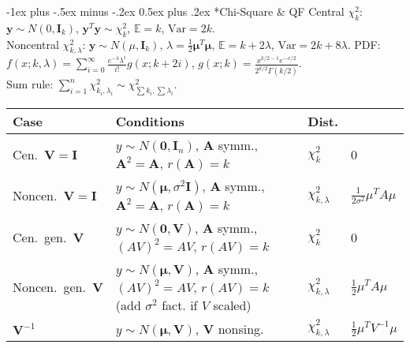 \documentclass[10pt,landscape]{article}
\makeatletter
\renewcommand{\subsection}{\@startsection{subsection}{2}{0mm}%
                                {-1ex plus -.5ex minus -.2ex}%
                                {0.5ex plus .2ex}%
                                {\normalfont\small\bfseries}}
\makeatother
\begin{document}
\begin{multicols}{3}
\subsection*{Chi-Square \& QF}
Central $\chi^2_k$: $\mathbf{y} \sim N(0,\mathbf{I}_k)$, $\mathbf{y}^T\mathbf{y} \sim \chi^2_k$, $\mathbb E=k$, $\mathrm{Var}=2k$.\\
Noncentral $\chi^2_{k,\lambda}$: $\mathbf{y} \sim N(\mu,\mathbf{I}_k)$, $\lambda=\frac{1}{2}\boldsymbol\mu^T\boldsymbol\mu$, $\mathbb E=k+2\lambda$, $\mathrm{Var}=2k+8\lambda$.
PDF:\\
\medskip
$f(x;k,\lambda) = \sum_{i=0}^\infty \frac{e^{-\lambda}\lambda^i}{i!} g(x;k+2i)$,  
$g(x;k) = \frac{x^{k/2-1} e^{-x/2}}{2^{k/2}\Gamma(k/2)}$.\\
Sum rule: $\sum_{i=1}^n \chi^2_{k_i,\lambda_i} \sim \chi^2_{\sum k_i, \sum\lambda_i}$.  \\
\medskip
\renewcommand{\arraystretch}{1.05}
\begin{tabular}{|p{0.9cm}|p{3.3cm}|p{0.6cm}|p{1.3cm}|}
\hline
\textbf{Case} & \textbf{Conditions} & \textbf{Dist.} & \boldmath{$\lambda$} \\
\hline
Cen.\ $\mathbf{V}=\mathbf{I}$& $y\!\sim\! N(\boldsymbol 0,\mathbf{I}_n)$, $\mathbf{A}$ symm., $\mathbf{A}^2=\mathbf{A}$, $r(\mathbf{A})=k$& $\chi^2_k$ & 0 \\
\hline
Noncen.\ $\mathbf{V}=\mathbf{I}$& $y\!\sim\! N(\boldsymbol\mu,\sigma^2\mathbf{I})$, $\mathbf{A}$ symm., $\mathbf{A}^2=\mathbf{A}$, $r(\mathbf{A})=k$& $\chi^2_{k,\lambda}$ & $\frac{1}{2\sigma^2}\mu^T A\mu$ \\
\hline
Cen.\ gen.\ $\mathbf{V}$& $y\!\sim\! N(\boldsymbol 0,\mathbf{V})$, $\mathbf{A}$ symm., $({A}{V})^2 = {A}{V}$, $r({A}{V})=k$& $\chi^2_k$ & 0 \\
\hline
Noncen.\ gen.\ $\mathbf{V}$& $y\!\sim\! N(\boldsymbol\mu,\mathbf{V})$, $\mathbf{A}$ symm., $({A}{V})^2 = {A}{V}$, $r({A}{V})=k$ (add $\sigma^2$ fact. if ${V}$ scaled)& $\chi^2_{k,\lambda}$ & $\frac12\mu^T A\mu$\\
\hline
$\mathbf{V}^{-1}$& $y\!\sim\! N(\boldsymbol\mu,\mathbf{V})$, $\mathbf{V}$ nonsing.& $\chi^2_{k,\lambda}$ & $\frac12\mu^T V^{-1}\mu$ \\
\hline
\end{tabular}


\end{multicols}
\end{document}
